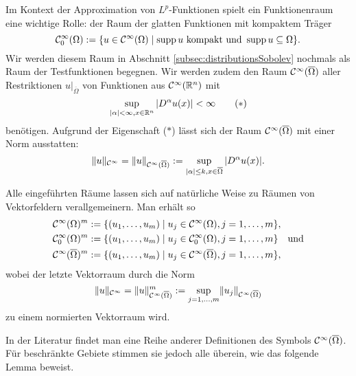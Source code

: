 Im Kontext der Approximation von $L^p$-Funktionen spielt ein Funktionenraum eine wichtige Rolle: der Raum der glatten Funktionen mit kompaktem Träger
$$
\mathcal{C}_0^\infty(\Omega) := \{ u \in \mathcal{C}^\infty(\Omega) \mid \operatorname{supp} u \text{ kompakt und } \operatorname{supp} u \subseteq \Omega\}.
$$
Wir werden diesem Raum in Abschnitt \ref{subsec:distributionsSobolev} nochmals als Raum der Testfunktionen begegnen.
Wir werden zudem den Raum $\mathcal{C}^\infty(\overline\Omega)$ aller Restriktionen $u|_{\overline\Omega}$ von Funktionen aus $\mathcal{C}^\infty(\mathbb{R}^n)$ mit
\begin{displaymath}
  \sup_{|\alpha| < \infty, x \in \mathbb{R}^n} |D^\alpha u(x)| < \infty \tag{$\ast$}
\end{displaymath}
benötigen.
Aufgrund der Eigenschaft ($\ast$) lässt sich der Raum $\mathcal{C}^\infty(\overline\Omega)$ mit einer Norm ausstatten:
$$
\lVert u \rVert_{\mathcal{C}^\infty} = \lVert u \rVert_{\mathcal{C}^\infty(\overline\Omega)} := \sup_{|\alpha|\leq k, x \in \overline\Omega} |D^\alpha u(x)|.
$$

Alle eingeführten Räume lassen sich auf natürliche Weise zu Räumen von Vektorfeldern verallgemeinern.
Man erhält so
\begin{align*}
  \mathcal{C}^\infty(\Omega)^m &:= \{(u_1,\dots,u_m) \mid u_j \in \mathcal{C}^\infty(\Omega), j = 1,\dots,m\}, \\
  \mathcal{C}_0^\infty(\Omega)^m &:= \{(u_1,\dots,u_m) \mid u_j \in \mathcal{C}_0^\infty(\Omega), j = 1,\dots,m\} \quad\text{und} \\
  \mathcal{C}^\infty(\overline\Omega)^m &:= \{(u_1,\dots,u_m) \mid u_j \in \mathcal{C}^\infty(\overline\Omega), j = 1,\dots,m\},
\end{align*}
wobei der letzte Vektorraum durch die Norm
$$
\lVert u \rVert_{\mathcal{C}^\infty} = \lVert u \rVert_{\mathcal{C}^\infty(\overline\Omega)}^m := \sup_{j = 1,\dots, m} \lVert u_j \rVert_{\mathcal{C}^\infty(\overline\Omega)}
$$
zu einem normierten Vektorraum wird.

In der Literatur findet man eine Reihe anderer Definitionen des Symbols $\mathcal{C}^\infty(\overline\Omega)$.
Für beschränkte Gebiete stimmen sie jedoch alle überein, wie das folgende Lemma beweist.

